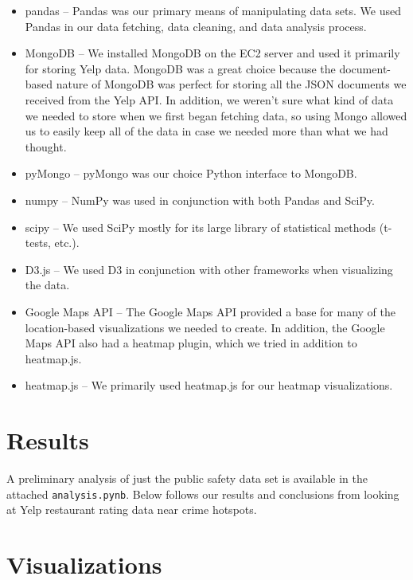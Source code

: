 \documentclass{article}
\begin{document}
\begin{itemize}
\item pandas -- Pandas was our primary means of manipulating data sets. We
  used Pandas in our data fetching, data cleaning, and data analysis
  process.
\item MongoDB -- We installed MongoDB on the EC2 server and used it
  primarily for storing Yelp data. MongoDB was a great choice because the
  document-based nature of MongoDB was perfect for storing all the JSON
  documents we received from the Yelp API. In addition, we weren't sure
  what kind of data we needed to store when we first began fetching data,
  so using Mongo allowed us to easily keep all of the data in case we
  needed more than what we had thought.
\item pyMongo -- pyMongo was our choice Python interface to MongoDB.
\item numpy -- NumPy was used in conjunction with both Pandas and SciPy.
\item scipy -- We used SciPy mostly for its large library of statistical
  methods (t-tests, etc.).
\item D3.js -- We used D3 in conjunction with other frameworks when
  visualizing the data.
\item Google Maps API -- The Google Maps API provided a base for many of
  the location-based visualizations we needed to create. In addition, the
  Google Maps API also had a heatmap plugin, which we tried in addition to
  heatmap.js.
\item heatmap.js -- We primarily used heatmap.js for our heatmap
  visualizations.
\end{itemize}

\section{Results}
\label{sec:results}

A preliminary analysis of just the public safety data set is available in
the attached \texttt{analysis.pynb}. Below follows our results and
conclusions from looking at Yelp restaurant rating data near crime
hotspots.

\section{Visualizations}
\end{document}

